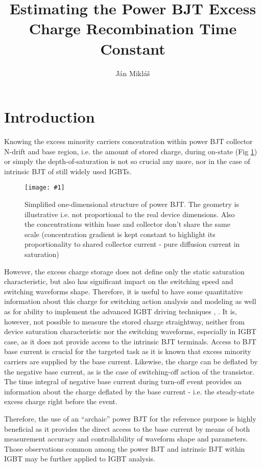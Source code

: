 \documentclass{eeict}
\title{{Estimating the Power BJT Excess Charge Recombination Time Constant}}
\author{Ján Mikláš}
\newcommand{\myfig}[3]
{
    \begin{figure}[!ht]
	\centering
	\texttt{[image: \#1]}
	\caption{#2}
	#3
    \end{figure}
}
\begin{document}

\maketitle


\section{Introduction}
Knowing the excess minority carriers concentration within power BJT collector N-drift and base region, i.e. the amount of stored charge, during on-state (Fig \ref{fig:rezimy}) or simply the depth-of-saturation is not so crucial any more, nor in the case of intrinsic BJT of still widely used IGBTs.
\myfig{BJT_koncentracie_vsetky_rezimy}{Simplified one-dimensional structure of power BJT. The geometry is illustrative i.e. not proportional to the real device dimensions. Also the concentrations within base and collector don't share the same scale (concentration gradient is kept constant to highlight its proportionality to shared collector current - pure diffusion current in saturation)}{\label{fig:rezimy}}
However, the excess charge storage does not define only the static saturation characteristic, but also has significant impact on the switching speed and switching waveforms shape. Therefore, it is useful to have some quantitative information about this charge for switching action analysis and modeling as well as for ability to implement the advanced IGBT driving techniques \cite{lit1}, \cite{lit2}.
It is, however, not possible to measure the stored charge straightway, neither from device saturation characteristic nor the switching waveforms, especially in IGBT case, as it does not provide access to the intrinsic BJT terminals.
Access to BJT base current is crucial for the targeted task as it is known that excess minority carriers are supplied by the base current. Likewise, the charge can be deflated by the negative base current, as is the case of switching-off action of the transistor. The time integral of negative base current during turn-off event provides an information about the charge deflated by the base current - i.e. the steady-state excess charge right before the event.

Therefore, the use of an ``archaic'' power BJT for the reference purpose is highly beneficial as it provides the direct access to the base current by means of both measurement accuracy and controllability of waveform shape and parameters. 
Those observations common among the power BJT and intrinsic BJT within IGBT may be further applied to IGBT analysis.
\end{document}
